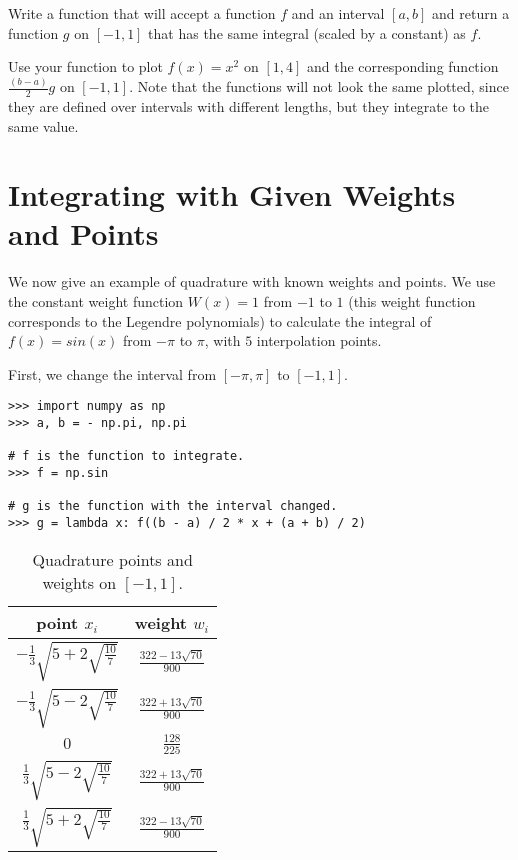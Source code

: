 \begin{problem}
Write a function that will accept a function $f$ and an interval $[a,b]$ and return a function $g$ on $[-1,1]$ that has the same integral (scaled by a constant) as $f$.

Use your function to plot $f(x) = x^2$ on $[1, 4]$ and the corresponding function $\frac{\left(b - a\right)}{2}g$ on $[-1,1]$.
Note that the functions will not look the same plotted, since they are defined over intervals with different lengths, but they integrate to the same value.
\end{problem}

\section*{Integrating with Given Weights and Points}

We now give an example of quadrature with known weights and points.
We use the constant weight function $W(x) = 1$ from $-1$ to $1$ (this weight function corresponds to the Legendre polynomials) to calculate the integral of $f(x) = sin(x)$ from $-\pi$ to $\pi$, with $5$ interpolation points.

First, we change the interval from $[-\pi,\pi]$ to $[-1,1]$.

\begin{lstlisting}
>>> import numpy as np
>>> a, b = - np.pi, np.pi

# f is the function to integrate.
>>> f = np.sin

# g is the function with the interval changed.
>>> g = lambda x: f((b - a) / 2 * x + (a + b) / 2)
\end{lstlisting}

\begin{table}[h!]
\begin{center}
\begin{tabular}{|c|c|}
\hline
point $x_i$ & weight $w_i$ \\
\hline
$-\frac{1}{3}\sqrt{5 + 2\sqrt{\frac{10}{7}}}$ &  $\frac{322-13\sqrt{70}}{900}$ \\
\hline
$-\frac{1}{3}\sqrt{5 - 2\sqrt{\frac{10}{7}}}$ & $\frac{322+13\sqrt{70}}{900}$ \\
\hline
$0$ & $\frac{128}{225}$ \\
\hline
$\frac{1}{3}\sqrt{5 - 2\sqrt{\frac{10}{7}}}$ & $\frac{322+13\sqrt{70}}{900}$ \\
\hline
$\frac{1}{3}\sqrt{5 + 2\sqrt{\frac{10}{7}}}$ & $\frac{322-13\sqrt{70}}{900}$ \\
\hline
\end{tabular}
\end{center}
\caption{Quadrature points and weights on $\left[-1, 1\right]$.}
\label{intro_table}
\end{table}

